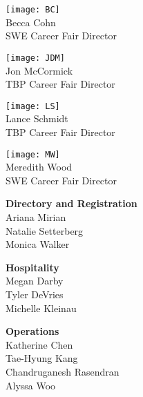 \documentclass[twoside]{article}
\begin{document}
    \begin{multicols}{2}
    \begin{minipage}{\columnwidth}
            \texttt{[image: BC]}\\
            Becca Cohn\\
            SWE Career Fair Director\\
            \end{minipage}
\begin{minipage}{\columnwidth}
            \texttt{[image: JDM]}\\
            Jon McCormick\\
            TBP Career Fair Director\\
            \end{minipage}
\begin{minipage}{\columnwidth}
            \texttt{[image: LS]}\\
            Lance Schmidt\\
            TBP Career Fair Director\\
            \end{minipage}
\begin{minipage}{\columnwidth}
            \texttt{[image: MW]}\\
            Meredith Wood\\
            SWE Career Fair Director\\
            \end{minipage}
\end{multicols}\begin{multicols}{2}
    \begin{minipage}{\columnwidth}
    {\bf Directory and Registration}\\
    Ariana Mirian\\
     Natalie Setterberg\\
    Monica Walker\\
    
\end{minipage}
    \begin{minipage}{\columnwidth}
    {\bf Hospitality}\\
    Megan Darby\\
    Tyler DeVries\\
    Michelle Kleinau\\
    
\end{minipage}
    \begin{minipage}{\columnwidth}
    {\bf Operations}\\
    Katherine Chen\\
    Tae-Hyung Kang\\
    Chandruganesh Rasendran\\
    Alyssa Woo\\
    

\end{minipage}
\end{multicols}
\end{document}
